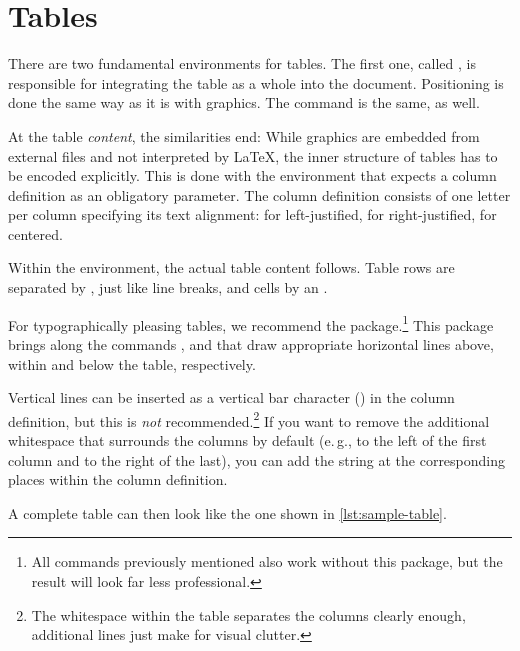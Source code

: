 \chapter{Tables}
\label{sec:tables}

There are two fundamental environments for tables.
The first one, called , is responsible for integrating the table as a whole into the document.
Positioning is done the same way as it is with graphics.
The  command is the same, as well.

At the table \emph{content}, the similarities end:
While graphics are embedded from external files and not interpreted by \LaTeX{},
the inner structure of tables has to be encoded explicitly.
This is done with the  environment that expects a column definition as an obligatory parameter.
The column definition consists of one letter per column specifying its text alignment:
 for left-justified,  for right-justified,  for centered.

Within the  environment, the actual table content follows.
Table rows are separated by , just like line breaks, and cells by an .

For typographically pleasing tables, we recommend the  package.\footnote{All commands previously mentioned also work without this package, but the result will look far less professional.}
This package brings along the commands ,  and  that draw appropriate horizontal lines above, within and below the table, respectively.

Vertical lines can be inserted as a vertical bar character (\sh{|}) in the column definition, but this is \emph{not} recommended.\footnote{The
whitespace within the table separates the columns clearly enough, additional lines just make for visual clutter.}
If you want to remove the additional whitespace that surrounds the columns by default (e.\,g., to the left of the first column and to the right of the last), you can add the string  at the corresponding places within the column definition.

A complete table can then look like the one shown in \cref{lst:sample-table}.


